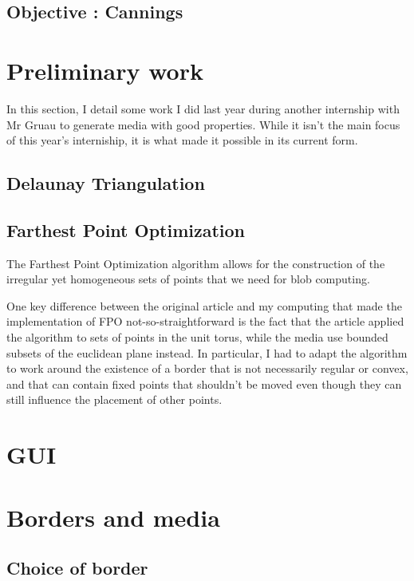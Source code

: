 \documentclass{article}
\begin{document}
\subsection{Objective : Cannings}

\section{Preliminary work}

In this section, I detail some work I did last year during another internship with Mr Gruau to generate media with good properties. While it isn't the main focus of this year's interniship, it is what made it possible in its current form.

\subsection{Delaunay Triangulation}

\subsection{Farthest Point Optimization}

The Farthest Point Optimization algorithm \supercite{FPO} allows for the construction of the irregular yet homogeneous sets of points that we need for blob computing.

One key difference between the original article and my computing that made the implementation of FPO not-so-straightforward is the fact that the article applied the algorithm to sets of points in the unit torus, while the media use bounded subsets of the euclidean plane instead. In particular, I had to adapt the algorithm to work around the existence of a border that is not necessarily regular or convex, and that can contain fixed points that shouldn't be moved even though they can still influence the placement of other points.


\renewcommand{\thesection}{\arabic{section}}
\setcounter{section}{0}

\section{GUI}

\section{Borders and media}

\subsection{Choice of border}
\end{document}

